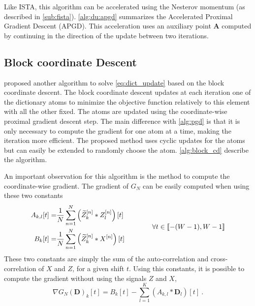 \documentclass[../thesis.tex]{subfiles}
\begin{document}
	Like ISTA, this algorithm can be accelerated using the Nesterov momentum (as described in
	\autoref{sub:fista}). \autoref{alg:du:apgd} summarizes the Accelerated Proximal Gradient
	Descent (APGD). This acceleration uses an auxiliary point ${\pmb A}$ computed by
	continuing in the direction of the update between two iterations.


\subsection{Block coordinate Descent}
\label{sub:block_cd}

	\citet{Mairal2010} proposed another algorithm to solve \autoref{eq:dict_update} based
	on the block coordinate descent. The block coordinate descent updates at each iteration
	one of the dictionary atoms to minimize the objective function relatively to this element
	with all the other fixed. The atoms are updated using the coordinate-wise
	proximal gradient descent step. The main difference with \autoref{alg:pgd} is that it is
	only necessary to compute the gradient for one atom at a time, making the iteration more
	efficient. The proposed method uses cyclic updates for the atoms but can easily be extended
	to randomly choose the atom. \autoref{alg:block_cd} describe the algorithm.	

	An important observation for this algorithm is the method to compute the coordinate-wise
	gradient. The gradient of $G_N$ can be easily computed when using these two constants
	\begin{equation}
		\label{eq:dict_AB}
		\begin{split}
			A_{k, l}[t] = & \frac{1}{N} \sum_{n=1}^N \left(\widetilde Z^{[n]}_k*Z^{[n]}_l\right)[t]\\
			B_k[t] = &  \frac{1}{N}\sum_{n=1}^N \left(\widetilde Z^{[n]}_k*X^{[n]}\right)[t]\\
		\end{split}
		\hskip4em  \forall t\in \llbracket -(W-1), W-1\rrbracket
	\end{equation}
	These two constants are simply the sum of the auto-correlation and cross-correlation
	of $X$ and $Z$, for a given shift $t$. Using this constants, it is possible to compute
	the gradient without using the signals $Z$ and $X$, \ie{}
	\begin{equation}
		\label{eq:block_cd}
		\nabla G_N(\pmb D)_k[t] = B_k[t] - \sum_{l=1}^K
					\left(A_{k, l}* \pmb D_l\right)[t]~.
	\end{equation}
\end{document}
